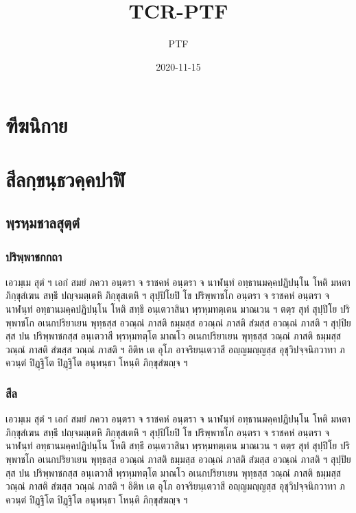 \documentclass[
]{book}
\title{TCR-PTF}
\author{PTF}
\date{2020-11-15}
\begin{document}
\maketitle

{
\setcounter{tocdepth}{5}
\tableofcontents
}
\hypertarget{uxe11uxe35uxe06uxe19uxe34uxe01uxe32uxe22}{%
\chapter*{ฑีฆนิกาย}\label{uxe11uxe35uxe06uxe19uxe34uxe01uxe32uxe22}}

\hypertarget{ds}{%
\chapter{สีลกฺขนฺธวคฺคปาฬิ}\label{ds}}

\hypertarget{uxe1euxe3auxe23uxe2buxe3auxe21uxe0auxe32uxe25uxe2auxe38uxe15uxe3auxe15uxe4d}{%
\section{พฺรหฺมชาลสุตฺตํ}\label{uxe1euxe3auxe23uxe2buxe3auxe21uxe0auxe32uxe25uxe2auxe38uxe15uxe3auxe15uxe4d}}

\hypertarget{uxe1buxe23uxe34uxe1euxe3auxe1euxe32uxe0auxe01uxe01uxe16uxe32}{%
\subsection{ปริพฺพาชกกถา}\label{uxe1buxe23uxe34uxe1euxe3auxe1euxe32uxe0auxe01uxe01uxe16uxe32}}

เอวมฺเม สุตํ ฯ เอกํ สมยํ ภควา อนฺตรา จ ราชคหํ อนฺตรา จ นาฬนฺทํ อทฺธานมคฺคปฏิปนฺโน โหติ มหตา ภิกฺขุสํเฆน สทฺธึ ปญฺจมตฺเตหิ ภิกฺขุสเตหิ ฯ สุปฺปิโยปิ โข ปริพฺพาชโก อนฺตรา จ ราชคหํ อนฺตรา จ นาฬนฺทํ อทฺธานมคฺคปฏิปนฺโน โหติ สทฺธึ อนฺเตวาสินา พฺรหฺมทตฺเตน มาณเวน ฯ ตตฺร สุทํ สุปฺปิโย ปริพฺพาชโก อเนกปริยาเยน พุทฺธสฺส อวณฺณํ ภาสติ ธมฺมสฺส อวณฺณํ ภาสติ สํฆสฺส อวณฺณํ ภาสติ ฯ สุปฺปิยสฺส ปน ปริพฺพาชกสฺส อนฺเตวาสี พฺรหฺมทตฺโต มาณโว อเนกปริยาเยน พุทฺธสฺส วณฺณํ ภาสติ ธมฺมสฺส วณฺณํ ภาสติ สํฆสฺส วณฺณํ ภาสติ ฯ อิติห เต อุโภ อาจริยนฺเตวาสี อญฺญมญฺญสฺส อุชุวิปจฺจนิกวาทา ภควนฺตํ ปิฏฺฐิโต ปิฏฺฐิโต อนุพนฺธา โหนฺติ ภิกฺขุสํฆญฺจ ฯ

\hypertarget{uxe2auxe35uxe25}{%
\subsection{สีล}\label{uxe2auxe35uxe25}}

เอวมฺเม สุตํ ฯ เอกํ สมยํ ภควา อนฺตรา จ ราชคหํ อนฺตรา จ นาฬนฺทํ อทฺธานมคฺคปฏิปนฺโน โหติ มหตา ภิกฺขุสํเฆน สทฺธึ ปญฺจมตฺเตหิ ภิกฺขุสเตหิ ฯ สุปฺปิโยปิ โข ปริพฺพาชโก อนฺตรา จ ราชคหํ อนฺตรา จ นาฬนฺทํ อทฺธานมคฺคปฏิปนฺโน โหติ สทฺธึ อนฺเตวาสินา พฺรหฺมทตฺเตน มาณเวน ฯ ตตฺร สุทํ สุปฺปิโย ปริพฺพาชโก อเนกปริยาเยน พุทฺธสฺส อวณฺณํ ภาสติ ธมฺมสฺส อวณฺณํ ภาสติ สํฆสฺส อวณฺณํ ภาสติ ฯ สุปฺปิยสฺส ปน ปริพฺพาชกสฺส อนฺเตวาสี พฺรหฺมทตฺโต มาณโว อเนกปริยาเยน พุทฺธสฺส วณฺณํ ภาสติ ธมฺมสฺส วณฺณํ ภาสติ สํฆสฺส วณฺณํ ภาสติ ฯ อิติห เต อุโภ อาจริยนฺเตวาสี อญฺญมญฺญสฺส อุชุวิปจฺจนิกวาทา ภควนฺตํ ปิฏฺฐิโต ปิฏฺฐิโต อนุพนฺธา โหนฺติ ภิกฺขุสํฆญฺจ ฯ
\end{document}
